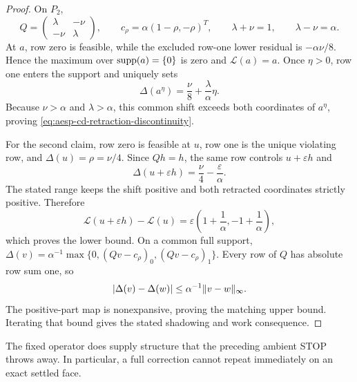 \begin{proof}
On $P_2$,
\begin{equation*}
 Q=\begin{pmatrix}\lambda&-\nu\\-\nu&\lambda\end{pmatrix},
 \qquad
 c_\rho=\alpha(1-\rho,-\rho)^T,
 \qquad \lambda+\nu=1,
 \qquad \lambda-\nu=\alpha.
\end{equation*}
At $a$, row zero is feasible, while the excluded row-one lower residual is
$-\alpha\nu/8$.  Hence the maximum over $\operatorname{supp}(a)=\{0\}$ is zero and
$\mathcal L(a)=a$.  Once $\eta>0$, row one enters the support and uniquely
sets
\begin{equation*}
 \Delta(a^\eta)=\frac\nu8+\frac\lambda\alpha\eta.
\end{equation*}
Because $\nu>\alpha$ and $\lambda>\alpha$, this common shift exceeds both
coordinates of $a^\eta$, proving
\cref{eq:aesp-cd-retraction-discontinuity}.

For the second claim, row zero is feasible at $u$, row one is the unique
violating row, and $\Delta(u)=\rho=\nu/4$.  Since $Qh=h$, the same row
controls $u+\varepsilon h$ and
\begin{equation*}
 \Delta(u+\varepsilon h)=\frac\nu4-\frac\varepsilon\alpha.
\end{equation*}
The stated range keeps the shift positive and both retracted coordinates
strictly positive.  Therefore
\begin{equation*}
 \mathcal L(u+\varepsilon h)-\mathcal L(u)
 =\varepsilon\left(1+\frac1\alpha,
                    -1+\frac1\alpha\right),
\end{equation*}
which proves the lower bound.  On a common full support,
$\Delta(v)=\alpha^{-1}\max\{0,(Qv-c_\rho)_0,(Qv-c_\rho)_1\}$.
Every row of $Q$ has absolute row sum one, so
\begin{equation*}
 \left\lvert \Delta(v)-\Delta(w) \right\rvert
 \leq\alpha^{-1}\lVert v-w\rVert_\infty.
\end{equation*}
The positive-part map is nonexpansive, proving the matching upper bound.
Iterating that bound gives the stated shadowing and work consequence.
\end{proof}

The fixed operator does supply structure that the preceding ambient STOP
throws away.  In particular, a full correction cannot repeat immediately on
an exact settled face.

